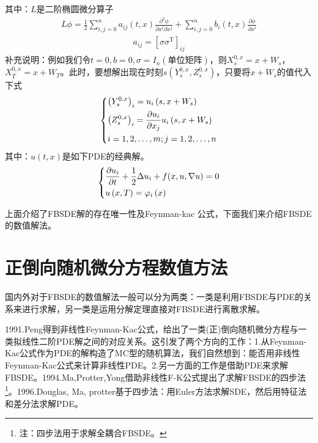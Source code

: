			其中：$L$是二阶椭圆微分算子
			\begin{align*}
			{L \phi } = \frac{1}{2}\sum\limits_{i,j = 0}^n {{a_{ij}}\left( {t,x} \right)\frac{{{\partial ^2}\phi }}{{\partial {x^i}\partial {x^j}}}}  + \sum\limits_{i,j = 0}^n {{b_i}\left( {t,x} \right)\frac{{\partial \phi }}{{\partial {x^i}}}} \end{align*}
			\begin{align*}
			{a_{ij}} = {\left[ {\sigma {\sigma ^\mathrm{T}}} \right]_{ij}}\end{align*}
			补充说明：例如我们令$t=0,b=0,\sigma=I_n(\text{单位矩阵})$，则$X_s^{0,x}=x+W_s$，$X_T^{0,x}=x+W_T$。此时，要想解出现在时刻$s(Y_s^{0,x},Z_s^{0,x})$，只要将$x+W_s$的值代入下式
					\begin{equation*}
					\centering
					\left\{\begin{lgathered}
					{{{\left( {Y_s^{0,x}} \right)}_i} = {u_i}\left( {s,x + {W_s}} \right)}\\
					{{{\left( {Z_s^{0,x}} \right)}_i} = \frac{{\partial {u_i}}}{{\partial {x_j}}}{u_i}\left( {s,x + {W_s}} \right)}\\
					{i = 1,2, \ldots ,m;j = 1,2, \ldots ,n}
					\end{lgathered} \right.
					\end{equation*}
			其中：$u(t,x)$是如下PDE的经典解。
					\begin{equation*}
					\centering
					\left\{\begin{lgathered}
					{\frac{{\partial u_i}}{{\partial t}} + \frac 12 \Delta u_i + f(x,u,{\nabla u})= 0}\\
					{u\left( {x,T} \right) = \varphi_i \left(x \right)}
			 		\end{lgathered} \right.
			 		\end{equation*}
			 \par
			上面介绍了FBSDE解的存在唯一性及Feynman-kac 公式，下面我们来介绍FBSDE的数值解法。

\section{正倒向随机微分方程数值方法}
	\par
	国内外对于FBSDE的数值解法一般可以分为两类：一类是利用FBSDE与PDE的关系来进行求解，另一类是运用\textcolor[rgb]{1.00,0.00,0.00}{分解定理}直接对FBSDE进行离散求解。
	\par
	1991.Peng\cite{1991.Peng}得到非线性Feynman-Kac公式，给出了一类(正)倒向随机微分方程与一类拟线性二阶PDE解之间的对应关系。这引发了两个方向的工作：1.从Feynman-Kac公式作为PDE的解构造了MC型的随机算法，我们自然想到：能否用非线性Feynman-Kac公式来计算非线性PDE。2.另一方面的工作是借助PDE来求解FBSDE。1994.Ma,Protter,Yong\cite{1994.Ma}借助非线性F-K公式提出了求解FBSDE的四步法\footnote{注：四步法用于求解全耦合FBSDE。}。1996.Douglas, Ma, protter\cite{1996.Douglas}基于四步法：用Euler方法求解SDE，然后用特征法和差分法求解PDE。

